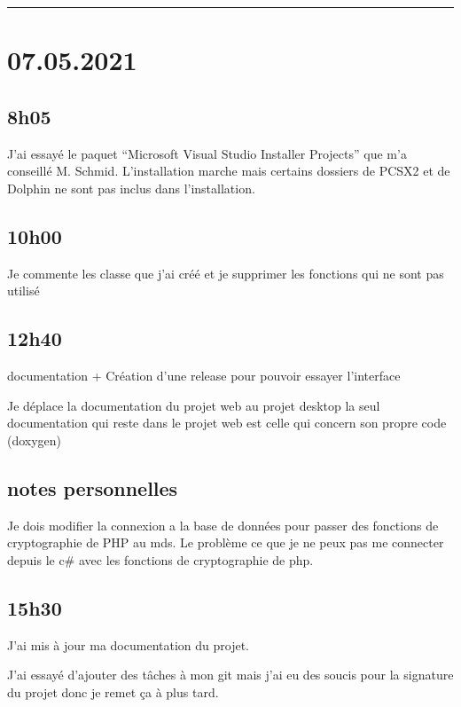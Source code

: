 \documentclass[a4paper,12pt,french]{sphinxmanual}
\begin{document}
\bigskip\hrule\bigskip



\section{07.05.2021}
\label{\detokenize{logbook:id83}}

\subsection{8h05}
\label{\detokenize{logbook:id84}}
\sphinxAtStartPar
J’ai essayé le paquet “Microsoft Visual Studio Installer Projects” que m’a conseillé M. Schmid. L’installation marche mais certains dossiers de PCSX2 et de Dolphin ne sont pas inclus dans l’installation.


\subsection{10h00}
\label{\detokenize{logbook:id85}}
\sphinxAtStartPar
Je commente les classe que j’ai créé et je supprimer les fonctions qui ne sont pas utilisé


\subsection{12h40}
\label{\detokenize{logbook:id86}}
\sphinxAtStartPar
documentation + Création d’une release pour pouvoir essayer l’interface

\sphinxAtStartPar
Je déplace la documentation du projet web au projet desktop la seul documentation qui reste dans le projet web est celle qui concern son propre code (doxygen)


\subsection{notes personnelles}
\label{\detokenize{logbook:id87}}
\sphinxAtStartPar
Je dois modifier la connexion a la base de données  pour passer des fonctions de cryptographie de PHP au mds. Le problème ce que je ne peux pas me connecter depuis le c\# avec les fonctions de cryptographie de php.


\subsection{15h30}
\label{\detokenize{logbook:id88}}
\sphinxAtStartPar
J’ai mis à jour ma documentation du projet.

\sphinxAtStartPar
J’ai essayé d’ajouter des tâches à mon git mais j’ai eu des soucis pour la signature du projet donc je remet ça à plus tard.
\end{document}

